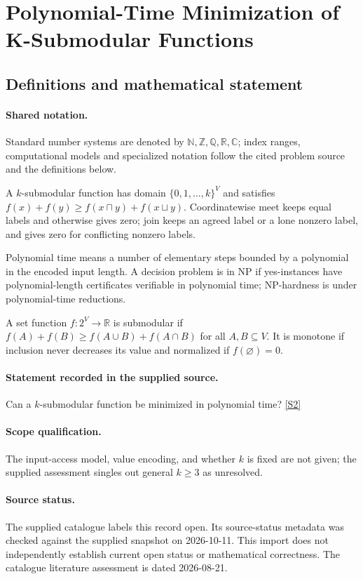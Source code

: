 \documentclass[11pt]{article}
\newcommand{\sref}[2]{\hyperlink{source:#1:#2}{[S#2]}}
\begin{document}
\section{Polynomial-Time Minimization of K-Submodular Functions}\label{statement}

\subsection{Definitions and mathematical statement}

\paragraph{Shared notation.}Standard number systems are denoted by $\mathbb N,\mathbb Z,\mathbb Q,\mathbb R,\mathbb C$; index ranges, computational models and specialized notation follow the cited problem source and the definitions below.


A $k$-submodular function has domain $\{0,1,\ldots,k\}^V$ and satisfies $f(x)+f(y)\geq f(x\sqcap y)+f(x\sqcup y)$. Coordinatewise meet keeps equal labels and otherwise gives zero; join keeps an agreed label or a lone nonzero label, and gives zero for conflicting nonzero labels.

Polynomial time means a number of elementary steps bounded by a polynomial in the encoded input length. A decision problem is in $\mathrm{NP}$ if yes-instances have polynomial-length certificates verifiable in polynomial time; NP-hardness is under polynomial-time reductions.

A set function $f:2^V\to\mathbb R$ is submodular if $f(A)+f(B)\geq f(A\cup B)+f(A\cap B)$ for all $A,B\subseteq V$. It is monotone if inclusion never decreases its value and normalized if $f(\varnothing)=0$.
\paragraph{Statement recorded in the supplied source.}
Can a $k$-submodular function be minimized in polynomial time? \sref{statement}{2}
\paragraph{Scope qualification.}
The input-access model, value encoding, and whether $k$ is fixed are not given; the supplied assessment singles out general $k\geq3$ as unresolved.
\paragraph{Source status.}
The supplied catalogue labels this record open. Its source-status metadata was checked against the supplied snapshot on 2026-10-11. This import does not independently establish current open status or mathematical correctness. The catalogue literature assessment is dated 2026-08-21.
\end{document}
